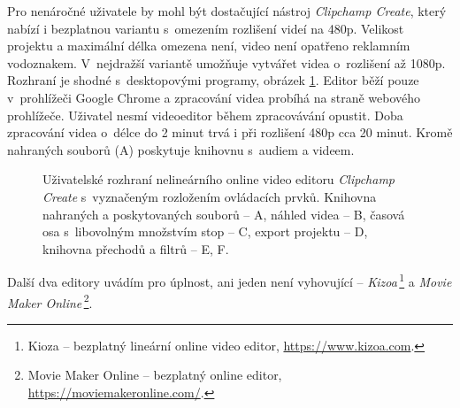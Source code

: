 Pro nenáročné uživatele by mohl být dostačující nástroj \textit{Clipchamp Create}, který nabízí i bezplatnou variantu s~omezením rozlišení videí na 480p. Velikost projektu a maximální délka omezena není, video není opatřeno reklamním vodoznakem. V~nejdražší variantě umožňuje vytvářet videa o~rozlišení až 1080p. Rozhraní je shodné s~desktopovými programy, obrázek \ref{img:clipchamp}. Editor běží pouze v~prohlížeči Google Chrome a zpracování videa probíhá na straně webového prohlížeče. Uživatel nesmí videoeditor během zpracovávání opustit. Doba zpracování videa o~délce do 2 minut trvá i při rozlišení 480p cca 20 minut. Kromě nahraných souborů (A) poskytuje knihovnu s~audiem a videem.
\begin{figure}[h]
	\centering
	\caption{Uživatelské rozhraní nelineárního online video editoru \textit{Clipchamp Create} s~vyznačeným rozložením ovládacích prvků. Knihovna nahraných a poskytovaných souborů -- A, náhled videa -- B, časová osa s~libovolným množstvím stop -- C, export projektu -- D, knihovna přechodů a filtrů -- E, F.}\label{img:clipchamp}
\end{figure}

Další dva editory uvádím pro úplnost, ani jeden není vyhovující -- \textit{Kizoa}\,\footnote{Kioza -- bezplatný lineární online video editor, \url{https://www.kizoa.com}.} a \textit{Movie Maker Online}\,\footnote{Movie Maker Online -- bezplatný online editor, \url{https://moviemakeronline.com/}.}.


